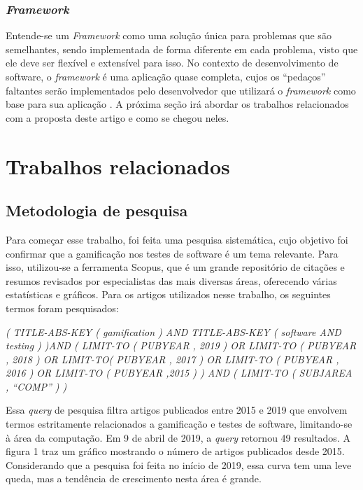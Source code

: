 \documentclass[twoside,english,brazilian]{UNISINOSartigo}
\begin{document}
\subsubsection{\textit{Framework}}

Entende-se um \textit{Framework} como uma solução única para problemas que são semelhantes, sendo implementada de forma diferente em cada problema, visto que ele deve ser flexível e extensível para isso. No contexto de desenvolvimento de software, o \textit{framework} é uma aplicação quase completa, cujos os ``pedaços'' faltantes serão implementados pelo desenvolvedor que utilizará o \textit{framework} como base para sua aplicação \cite{ufcg}. A próxima seção irá abordar os trabalhos relacionados com a proposta deste artigo e como se chegou neles.


\section{Trabalhos relacionados}

\subsection{Metodologia de pesquisa}

Para come\c{c}ar esse trabalho, foi feita uma pesquisa sistem\'{a}tica, cujo objetivo foi confirmar que a gamifica\c{c}\~{a}o nos testes de software \'{e} um tema relevante. Para isso, utilizou-se a ferramenta Scopus, que \'{e} um grande reposit\'{o}rio de cita\c{c}\~{o}es e resumos revisados por especialistas das mais diversas \'{a}reas, oferecendo  v\'{a}rias estat\'{i}sticas e gr\'{a}ficos. Para os artigos utilizados nesse trabalho, os seguintes termos foram pesquisados:

\textit{( TITLE-ABS-KEY ( gamification ) AND TITLE-ABS-KEY ( software AND testing ) )AND ( LIMIT-TO ( PUBYEAR , 2019 ) OR LIMIT-TO ( PUBYEAR , 2018 ) OR LIMIT-TO( PUBYEAR , 2017 ) OR LIMIT-TO ( PUBYEAR , 2016 ) OR LIMIT-TO ( PUBYEAR ,2015 ) ) AND ( LIMIT-TO ( SUBJAREA , ``COMP'' ) )}

Essa \textit{query} de pesquisa filtra artigos publicados entre 2015 e 2019 que envolvem termos estritamente relacionados a gamifica\c{c}\~{a}o e testes de software, limitando-se \`{a} \'{a}rea da computa\c{c}\~{a}o. Em 9 de abril de 2019, a \textit{query} retornou 49 resultados. A figura 1 traz um gr\'{a}fico mostrando o n\'{u}mero de artigos publicados desde 2015. Considerando que a pesquisa foi feita no in\'{i}cio de 2019, essa curva tem uma leve queda, mas a tend\^{e}ncia de crescimento nesta \'{a}rea \'{e} grande.
\end{document}
